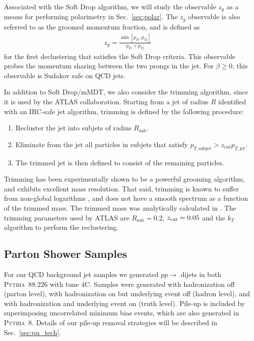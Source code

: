 \documentclass[11pt,letterpaper]{article}
\newcommand{\pythia}{\textsc{Pythia~8}\xspace}
\DeclareRobustCommand{\Sec}[1]{Sec.~\ref{#1}}
\newcommand{\zcut}{z_{\rm cut}}
\begin{document}
Associated with the Soft Drop algorithm, we will study the observable $z_g$ as a means for performing polarimetry in \Sec{sec:polar}.
%
The $z_g$ observable is also referred to as the groomed momentum fraction, and is defined as
%
\begin{align}
z_g=\frac{\min\left[ p_{Ti}, p_{Tj}  \right]}{p_{Ti}+p_{Tj}}
\end{align}
%
for the first declustering that satisfies the Soft Drop criteria.
%
This observable probes the momentum sharing between the two prongs in the
jet. For $\beta \ge 0$, this observable is Sudakov safe \cite{Larkoski:2013paa} on QCD
jets.

In addition to Soft Drop/mMDT, we also consider the trimming algorithm, since it is used by the ATLAS collaboration.
%
Starting from a jet of radius $R$ identified with an IRC-safe jet algorithm, trimming is defined by the following procedure:
%
\begin{enumerate}
%
\item Recluster the jet into subjets of radius $R_{\text{sub}}$.
%
\item Eliminate from the jet all particles in subjets that satisfy
  $p_{T,\text{subjet}} > z_{\text{cut}}p_{T,\text{jet}}$.
%
\item The trimmed jet is then defined to consist of the remaining particles.
%
\end{enumerate}
%
Trimming has been experimentally shown to be a powerful grooming algorithm, and exhibits excellent mass resolution.
%
That said, trimming is known to suffer from non-global logarithms \cite{Dasgupta:2001sh}, and does not have a smooth spectrum as a function of the trimmed mass.
%
The trimmed mass was analytically calculated in \cite{Dasgupta:2013ihk}.
%
The trimming parameters used by ATLAS are $R_{\text{sub}}=0.2$,  $ \zcut=0.05$ and the $k_T$ algorithm to perform the reclustering.


\subsection{Parton Shower Samples}\label{sec:samples_sub}



For our QCD background jet samples we generated $pp\to$ dijets in both \pythia{8.226} \cite{Sjostrand:2006za,Sjostrand:2007gs} with tune $4$C. 
%
Samples were generated with hadronization off (parton level), with hadronization on but underlying event off (hadron level), and with hadronization and underlying event on (truth level). Pile-up is included by superimposing uncorrelated minimum bias events, which are also generated in \pythia. Details of our pile-up removal strategies will be described in \Sec{sec:pu_tech}.
\end{document}
